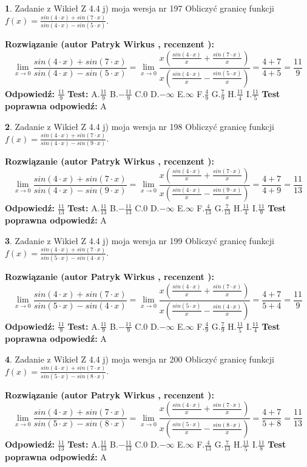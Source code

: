 \documentclass[12pt, a4paper]{article}
\theoremstyle{definition} %
\newtheorem{zad}{}
\newcommand{\zadStart}[1]{\begin{zad}#1\newline}
\newcommand{\zadStop}{\end{zad}}
\newcommand{\rozwStart}[2]{\noindent \textbf{Rozwiązanie (autor #1 , recenzent #2): }\newline}
\newcommand{\rozwStop}{\newline}
\newcommand{\odpStart}{\noindent \textbf{Odpowiedź:}\newline}
\newcommand{\odpStop}{\newline}
\newcommand{\testStart}{\noindent \textbf{Test:}\newline}
\newcommand{\testStop}{\newline}
\newcommand{\kluczStart}{\noindent \textbf{Test poprawna odpowiedź:}\newline}
\newcommand{\kluczStop}{\newline}
\begin{document}
\zadStart{Zadanie z Wikieł Z 4.4 j) moja wersja nr 197}
Obliczyć granicę funkcji $f(x)=\frac{sin(4\cdot x) +sin(7\cdot x)}{sin(4\cdot x) -sin(5\cdot x)}$.
\zadStop
\rozwStart{Patryk Wirkus}{}
$$\lim\limits_{x\to 0}\frac{sin(4\cdot x) +sin(7\cdot x)}{sin(4\cdot x) -sin(5\cdot x)}=\lim\limits_{x\to 0}\frac{x(\frac{sin(4\cdot x)}{x}+\frac{sin(7\cdot x)}{x})}{x(\frac{sin(4\cdot x)}{x}-\frac{sin(5\cdot x)}{x})}=\frac{4+7}{4+5} = \frac{11}{9}$$
\rozwStop
\odpStart
$\frac{11}{9}$
\odpStop
\testStart
A.$\frac{11}{9}$
B.$-\frac{11}{9}$
C.$0$
D.$-\infty$
E.$\infty$
F.$\frac{4}{9}$
G.$\frac{7}{9}$
H.$\frac{11}{4}$
I.$\frac{11}{5}$
\testStop
\kluczStart
A
\kluczStop



\zadStart{Zadanie z Wikieł Z 4.4 j) moja wersja nr 198}
Obliczyć granicę funkcji $f(x)=\frac{sin(4\cdot x) +sin(7\cdot x)}{sin(4\cdot x) -sin(9\cdot x)}$.
\zadStop
\rozwStart{Patryk Wirkus}{}
$$\lim\limits_{x\to 0}\frac{sin(4\cdot x) +sin(7\cdot x)}{sin(4\cdot x) -sin(9\cdot x)}=\lim\limits_{x\to 0}\frac{x(\frac{sin(4\cdot x)}{x}+\frac{sin(7\cdot x)}{x})}{x(\frac{sin(4\cdot x)}{x}-\frac{sin(9\cdot x)}{x})}=\frac{4+7}{4+9} = \frac{11}{13}$$
\rozwStop
\odpStart
$\frac{11}{13}$
\odpStop
\testStart
A.$\frac{11}{13}$
B.$-\frac{11}{13}$
C.$0$
D.$-\infty$
E.$\infty$
F.$\frac{4}{13}$
G.$\frac{7}{13}$
H.$\frac{11}{4}$
I.$\frac{11}{9}$
\testStop
\kluczStart
A
\kluczStop



\zadStart{Zadanie z Wikieł Z 4.4 j) moja wersja nr 199}
Obliczyć granicę funkcji $f(x)=\frac{sin(4\cdot x) +sin(7\cdot x)}{sin(5\cdot x) -sin(4\cdot x)}$.
\zadStop
\rozwStart{Patryk Wirkus}{}
$$\lim\limits_{x\to 0}\frac{sin(4\cdot x) +sin(7\cdot x)}{sin(5\cdot x) -sin(4\cdot x)}=\lim\limits_{x\to 0}\frac{x(\frac{sin(4\cdot x)}{x}+\frac{sin(7\cdot x)}{x})}{x(\frac{sin(5\cdot x)}{x}-\frac{sin(4\cdot x)}{x})}=\frac{4+7}{5+4} = \frac{11}{9}$$
\rozwStop
\odpStart
$\frac{11}{9}$
\odpStop
\testStart
A.$\frac{11}{9}$
B.$-\frac{11}{9}$
C.$0$
D.$-\infty$
E.$\infty$
F.$\frac{4}{9}$
G.$\frac{7}{9}$
H.$\frac{11}{5}$
I.$\frac{11}{4}$
\testStop
\kluczStart
A
\kluczStop



\zadStart{Zadanie z Wikieł Z 4.4 j) moja wersja nr 200}
Obliczyć granicę funkcji $f(x)=\frac{sin(4\cdot x) +sin(7\cdot x)}{sin(5\cdot x) -sin(8\cdot x)}$.
\zadStop
\rozwStart{Patryk Wirkus}{}
$$\lim\limits_{x\to 0}\frac{sin(4\cdot x) +sin(7\cdot x)}{sin(5\cdot x) -sin(8\cdot x)}=\lim\limits_{x\to 0}\frac{x(\frac{sin(4\cdot x)}{x}+\frac{sin(7\cdot x)}{x})}{x(\frac{sin(5\cdot x)}{x}-\frac{sin(8\cdot x)}{x})}=\frac{4+7}{5+8} = \frac{11}{13}$$
\rozwStop
\odpStart
$\frac{11}{13}$
\odpStop
\testStart
A.$\frac{11}{13}$
B.$-\frac{11}{13}$
C.$0$
D.$-\infty$
E.$\infty$
F.$\frac{4}{13}$
G.$\frac{7}{13}$
H.$\frac{11}{5}$
I.$\frac{11}{8}$
\testStop
\kluczStart
A
\kluczStop
\end{document}

